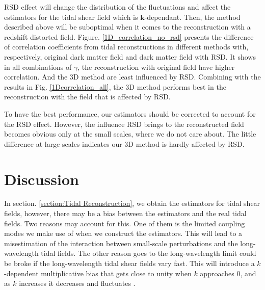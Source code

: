 \documentclass[aps,prd,twocolumn,showpacs,superscriptaddress,groupedaddress,nofootinbib]{revtex4}  %
\begin{document}
RSD effect will change the distribution of the fluctuations and affect the estimators for the tidal shear field which is $\bm{k}$-dependant.  Then, the method described above will be suboptimal when it comes to the reconstruction with a redshift distorted field.
Figure. \ref{1D_correlation_no_rsd} presents the difference of correlation coefficients from tidal reconstructions in different methods with, respectively, original dark matter field and dark matter field with RSD. It shows in all combinations of $\gamma$, the reconstruction with original field have higher correlation. And the 3D method are least influenced by RSD. Combining with the results in Fig. \ref{1Dcorrelation_all}, the 3D method performs best in the reconstruction with the field that is affected by RSD. 

To have the best performance, our estimators should be corrected to account for the RSD effect. However, the influence RSD brings to the reconstructed field becomes obvious only at the small scales, where we do not care about. The little difference at large scales indicates our 3D method is hardly affected by RSD.


\section{Discussion}\label{section:Discussion}

In section. \ref{section:Tidal Reconstruction}, we obtain the estimators for tidal shear fields, however, there may be a bias between the estimators and the real tidal fields. Two reasons may account for this. One of them is the limited coupling modes we make use of when we construct the estimators. This will lead to a misestimation of the interaction between small-scale perturbations and the long-wavelength tidal fields. The other reason goes to the long-wavelength limit could be broke if the long-wavelength tidal shear fields vary fast. This will introduce a $k$-dependent multiplicative bias that gets close to unity when $k$ approaches 0, and as $k$ increases it decreases and fluctuates \cite{2008:lu, 2012bucher}. 
\end{document}
